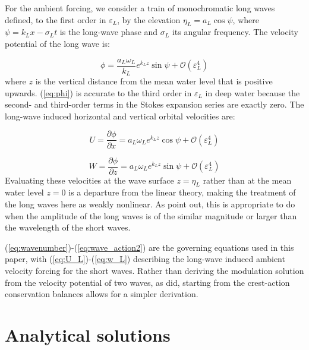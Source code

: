 \documentclass[lineno]{jfm}
\begin{document}
For the ambient forcing, we consider a train of monochromatic long waves
defined, to the first order in $\varepsilon_L$, by the elevation
$\eta_L = a_L \cos{\psi}$, where $\psi = k_L x - \sigma_L t$ is the long-wave
phase and $\sigma_L$ its angular frequency.
The velocity potential of the long wave is:

\begin{equation}
\label{eq:phi}
\phi = \dfrac{a_L \omega_L}{k_L} e^{k_L z} \sin{\psi} + \mathcal{O}(\varepsilon_L^4)
\end{equation}
where $z$ is the vertical distance from the mean water level that is positive
upwards.
(\ref{eq:phi}) is accurate to the third order in $\varepsilon_L$ in deep water
because the second- and third-order terms in the Stokes expansion series are
exactly zero.
The long-wave induced horizontal and vertical orbital velocities are:

\begin{equation}
\label{eq:U_L}
U =
\frac{\partial \phi}{\partial x} =
a_L \omega_L e^{k_L z} \cos{\psi} + \mathcal{O}(\varepsilon_L^4)
\end{equation}

\begin{equation}
\label{eq:w_L}
W =
\frac{\partial \phi}{\partial z} =
a_L \omega_L e^{k_L z} \sin{\psi} + \mathcal{O}(\varepsilon_L^4)
\end{equation}
Evaluating these velocities at the wave surface $z = \eta_L$ rather than at
the mean water level $z=0$ is a departure from the linear theory, making the
treatment of the long waves here as weakly nonlinear.
As \citet{zhang1990evolution} point out, this is appropriate to do when the
amplitude of the long waves is of the similar magnitude or larger than the
wavelength of the short waves.

(\ref{eq:wavenumber})-(\ref{eq:wave_action2}) are the governing equations used
in this paper, with (\ref{eq:U_L})-(\ref{eq:w_L}) describing the long-wave
induced ambient velocity forcing for the short waves. 
Rather than deriving the modulation solution from the velocity
potential of two waves, as \citet{longuet1960changes} did, starting from the
crest-action conservation balances allows for a simpler derivation.

\section{Analytical solutions}
\label{section:analytical_solutions}
\end{document}
